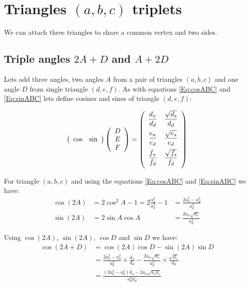 \documentclass[11pt]{article}
\begin{document}
\section{Triangles $(a,b,c)$ triplets}

We can attach three triangles to share a common vertex and two sides.

\subsection{Triple angles $2A+D$ and $A+2D$}

Lets add three angles, two angles $A$ from a pair of triangles $(a,b,c)$ and one angle $D$ from single triangle $(d,e,f)$.
As with equations \ref{Eq:cosABC} and \ref{Eq:sinABC} lets define cosines and sines of triangle $(d,e,f)$:

\begin{equation}\label{Eq:cossinDEF}
\left({\begin{array}{c c} {\cos} & {\sin}\end{array}}\right)
\left({\begin{array}{c} D\\ E\\ F\\ \end{array}}\right)
= \left({\begin{array}{c c}
\dfrac{d_n}{d_d} & \dfrac{\sqrt{d_s}}{d_d}\\[10pt]
\dfrac{e_n}{e_d} & \dfrac{\sqrt{e_s}}{e_d}\\[10pt]
\dfrac{f_n}{f_d} & \dfrac{\sqrt{f_s}}{f_d}\\[10pt]
\end{array}}\right)
\end{equation}

For triangle $(a,b,c)$ and using the equations \ref{Eq:cosABC} and \ref{Eq:sinABC} we have:
\begin{align}
\cos{(2A)} &= 2\cos^2{A} - 1 = 2\frac{a_n^2}{a_d^2} - 1 &= \frac{2a_n^2 - a_d^2}{a_d^2}\\
\sin{(2A)} &= 2\sin{A}\cos{A} &= \frac{2a_n\sqrt{a_s}}{a_d^2}
\end{align}

Using $\cos{(2A)}$, $\sin{(2A)}$, $\cos{D}$ and $\sin{D}$ we have:
\begin{align}
\cos{(2A+D)} &= \cos{(2A)}\cos{D} - \sin{(2A)}\sin{D} \nonumber\\
 &= \frac{2a_n^2-a_d^2}{a_d^2} \times \frac{d_n}{d_d} - \frac{2a_n\sqrt{a_s}}{a_d^2} \times \frac{\sqrt{d_s}}{d_d}\nonumber\\
 &= \frac{(2a_n^2 - a_d^2)d_n - 2a_n\sqrt{a_sd_s}}{a_d^2d_d}
\end{align}
\end{document}
